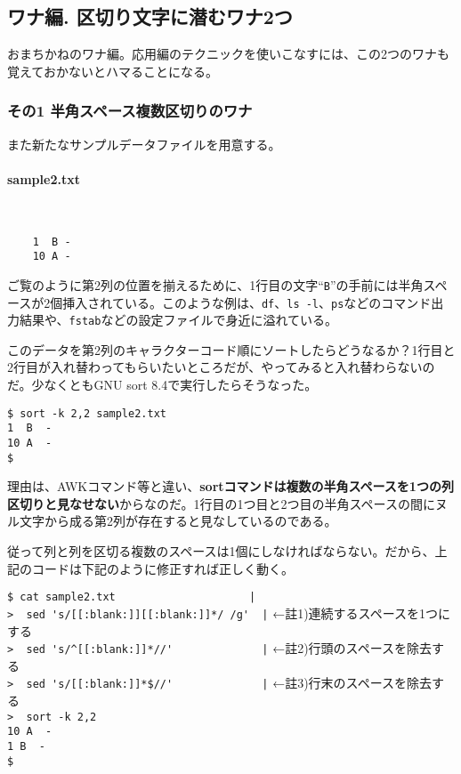 \subsection*{ワナ編. 区切り文字に潜むワナ2つ}

おまちかねのワナ編。応用編のテクニックを使いこなすには、この2つのワナも覚えておかないとハマることになる。

\subsubsection*{その1 半角スペース複数区切りのワナ}

また新たなサンプルデータファイルを用意する。

\paragraph{sample2.txt} 　\\
\begin{frameboxit}{160.0mm}
\begin{verbatim}
	1  B -
	10 A -
\end{verbatim}
\end{frameboxit}

ご覧のように第2列の位置を揃えるために、1行目の文字``\verb|B|''の手前には半角スペースが2個挿入されている。このような例は、\verb|df|、\verb|ls -l|、\verb|ps|などのコマンド出力結果や、\verb|fstab|などの設定ファイルで身近に溢れている。

このデータを第2列のキャラクターコード順にソートしたらどうなるか？1行目と2行目が入れ替わってもらいたいところだが、やってみると入れ替わらないのだ。少なくともGNU sort 8.4で実行したらそうなった。

\begin{screen}
	\verb!$ sort -k 2,2 sample2.txt! \return \\
	\verb!1  B  -! \\
	\verb!10 A  -! \\
	\verb!$ !
\end{screen}

理由は、AWKコマンド等と違い、\textbf{sortコマンドは複数の半角スペースを1つの列区切りと見なせない}からなのだ。1行目の1つ目と2つ目の半角スペースの間にヌル文字から成る第2列が存在すると見なしているのである。

従って列と列を区切る複数のスペースは1個にしなければならない。だから、上記のコードは下記のように修正すれば正しく動く。

\begin{screen}
	\verb!$ cat sample2.txt                     |! \return \\
	\verb!>  sed 's/[[:blank:]][[:blank:]]*/ /g'  |! \return  ←註1)連続するスペースを1つにする \\
	\verb!>  sed 's/^[[:blank:]]*//'              |! \return  ←註2)行頭のスペースを除去する \\
	\verb!>  sed 's/[[:blank:]]*$//'              |! \return  ←註3)行末のスペースを除去する \\
	\verb!>  sort -k 2,2! \return \\
	\verb!10 A  -! \\
	\verb!1 B  -! \\
	\verb!$ !
\end{screen}

